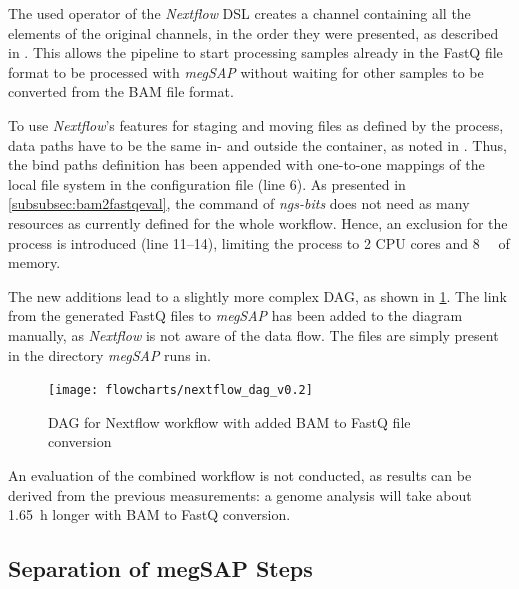 The used  operator of the \textit{Nextflow} \ac{DSL} creates a channel containing all the elements of the original channels, in the order they were presented, as described in \autocite{SeqeraLabs2022b}. This allows the pipeline to start processing samples already in the FastQ file format to be processed with \textit{\ac{megSAP}} without waiting for other samples to be converted from the BAM file format.

To use \textit{Nextflow}'s features for staging and moving files as defined by the  process, data paths have to be the same in- and outside the container, as noted in \autocite{SeqeraLabs2022c}. Thus, the bind paths definition has been appended with one-to-one mappings of the local file system in the configuration file (line \num{6}). As presented in \cref{subsubsec:bam2fastqeval}, the  command of \textit{ngs-bits} does not need as many resources as currently defined for the whole workflow. Hence, an exclusion for the  process is introduced (line \numrange{11}{14}), limiting the process to \num{2} CPU cores and \SI{8}{\giga\byte} of memory.

The new additions lead to a slightly more complex \ac{DAG}, as shown in \cref{fig:dag_v02}. The link from the generated FastQ files to \textit{\ac{megSAP}} has been added to the diagram manually, as \textit{Nextflow} is not aware of the data flow. The files are simply present in the directory \textit{\ac{megSAP}} runs in.

\begin{figure}[H]
    \centering
	\texttt{[image: flowcharts/nextflow\_dag\_v0.2]}
	\caption{\Ac{DAG} for Nextflow workflow with added BAM to FastQ file conversion}
	\label{fig:dag_v02}
\end{figure}

An evaluation of the combined workflow is not conducted, as results can be derived from the previous measurements: a genome analysis will take about \SI{1.65}{\hour} longer with BAM to FastQ conversion.

\subsection{Separation of \acs{megSAP} Steps}\label{subsection:seperationofsteps}

